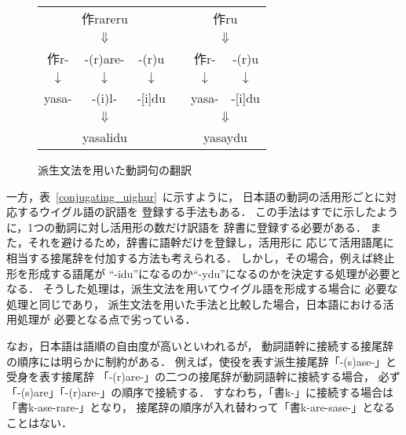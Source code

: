 \begin{figure}[tbp]
\begin{center}
\begin{tabular}{cccccc}
\multicolumn{3}{c}{作rareru} & \vline
&\multicolumn{2}{c}{作ru}\vspace{-2pt}\\ 
\multicolumn{3}{c}{$\Downarrow$} & \vline
&\multicolumn{2}{c}{$\Downarrow$}
\vspace{-2pt}\\ 
作r-& -(r)are- & -(r)u &\vline&作r-& -(r)u \vspace{-2pt}\\
$\downarrow$&$\downarrow$&$\downarrow$&\vline&$\downarrow$&$\downarrow$
\vspace{-2pt}\\
yasa- & -(i)l- & -[i]du & \vline&yasa- & -[i]du\vspace{-2pt}\\
\multicolumn{3}{c}{$\Downarrow$} & \vline&\multicolumn{2}{c}{$\Downarrow$}
\vspace{-2pt}\\ 
\multicolumn{3}{c}{yasalidu} & &
\multicolumn{2}{c}{yasaydu}\\ 
\end{tabular}
\caption{派生文法を用いた動詞句の翻訳}
\label{verb_2}
\end{center}
\end{figure}

一方，表~\ref{conjugating_uighur}~に示すように，
日本語の動詞の活用形ごとに対応するウイグル語の訳語を
登録する手法もある．
この手法はすでに示したように，1つの動詞に対し活用形の数だけ訳語を
辞書に登録する必要がある．
また，それを避けるため，辞書に語幹だけを登録し，活用形に
応じて活用語尾に相当する接尾辞を付加する方法も考えられる．
しかし，その場合，例えば終止形を形成する語尾が
``-idu''になるのか``-ydu''になるのかを決定する処理が必要となる．
そうした処理は，派生文法を用いてウイグル語を形成する場合に
必要な処理と同じであり，
派生文法を用いた手法と比較した場合，日本語における活用処理が
必要となる点で劣っている．

なお，日本語は語順の自由度が高いといわれるが，
動詞語幹に接続する接尾辞の順序には明らかに制約がある．
例えば，使役を表す派生接尾辞「-(s)ase-」と
受身を表す接尾辞\linebreak
「-(r)are-」の二つの接尾辞が動詞語幹に接続する場合，
必ず「-(s)are」「-(r)are-」の順序で接続する．
すなわち，「書k-」に接続する場合は「書k-ase-rare-」となり，
接尾辞の順序が入れ替わって「書k-are-sase-」となることはない．

